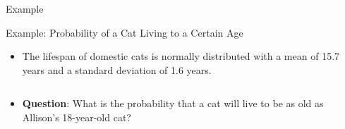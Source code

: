 \documentclass[
  ignorenonframetext,
]{beamer}
\providecommand{\tightlist}{%
  \setlength{\itemsep}{0pt}\setlength{\parskip}{0pt}}
\begin{document}
\begin{frame}{Example}
\label{example-8}
\end{frame}

\begin{frame}{Example: Probability of a Cat Living to a Certain Age}
\label{example-probability-of-a-cat-living-to-a-certain-age}
\begin{itemize}
\tightlist
\item
  The lifespan of domestic cats is normally distributed with a mean of
  15.7 years and a standard deviation of 1.6 years.
\end{itemize}

\begin{columns}[T]
\begin{column}{0.48\textwidth}
\vspace{1cm}

\begin{itemize}
\tightlist
\item
  \textbf{Question}: What is the probability that a cat will live to be
  as old as Allison's 18-year-old cat?
\end{itemize}
\end{column}

\begin{column}{0.48\textwidth}
\end{column}
\end{columns}
\end{frame}
\end{document}
